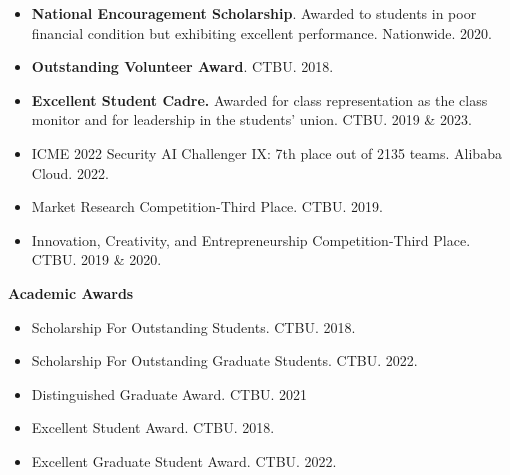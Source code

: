 \documentclass[a4paper,20pt]{article}
\begin{document}
    \begin{itemize}
    \centering
    \justifying
 \item {\textbf{National Encouragement Scholarship}. Awarded to students in poor financial condition but exhibiting excellent performance. Nationwide. 2020.}
\vspace{-5pt}	
    \item {\textbf{Outstanding Volunteer Award}. CTBU. 2018.}
    \vspace{-5pt}
    \item {\textbf{Excellent Student Cadre.} Awarded for class representation as the class monitor and for leadership in the students' union. CTBU. 2019 \& 2023.}
    \vspace{-5pt}
    \item {ICME 2022 Security AI Challenger IX: 7th place out of 2135 teams. Alibaba Cloud. 2022.}
    \vspace{-5pt}
    \item {Market Research Competition-Third Place. CTBU. 2019.}
    \vspace{-5pt}
    \item {Innovation, Creativity, and Entrepreneurship Competition-Third Place. CTBU. 2019 \& 2020.}
\end{itemize}


 \textbf{Academic Awards}

    \begin{itemize}
    \centering
    \justifying
   \item{Scholarship For Outstanding Students. CTBU. 2018.}
    \vspace{-5pt}
       \item{Scholarship For Outstanding Graduate Students. CTBU. 2022.}
    \vspace{-5pt}
    \item{Distinguished Graduate Award. CTBU. 2021}
        \vspace{-5pt}
        \item{Excellent Student Award. CTBU. 2018.}
    \vspace{-5pt}
    \item{Excellent Graduate Student Award. CTBU. 2022.}

    
\end{itemize}
\end{document}
